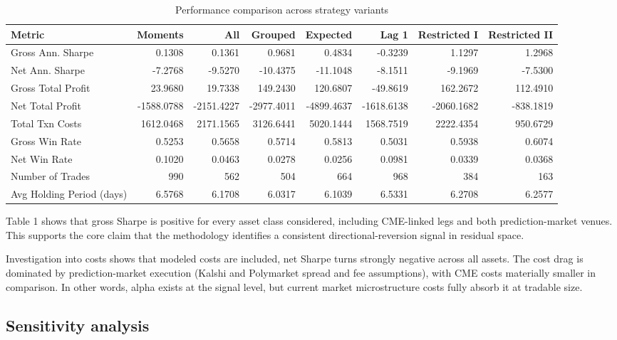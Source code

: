 \begin{table}[h!]
\centering
\begin{tabular}{lrrrrrrr}
\hline
\textbf{Metric} & \textbf{Moments} & \textbf{All} & \textbf{Grouped} & \textbf{Expected}  & \textbf{Lag 1} & \textbf{Restricted I} & \textbf{Restricted II} \\
\hline
Gross Ann. Sharpe & 0.1308 & 0.1361 & 0.9681 & 0.4834 & -0.3239 & 1.1297 & 1.2968 \\
Net Ann. Sharpe & -7.2768 & -9.5270 & -10.4375 & -11.1048 & -8.1511 & -9.1969 & -7.5300 \\
Gross Total Profit & 23.9680 & 19.7338 & 149.2430 & 120.6807 & -49.8619 & 162.2672 & 112.4910 \\
Net Total Profit & -1588.0788 & -2151.4227 & -2977.4011 & -4899.4637 & -1618.6138 & -2060.1682 & -838.1819 \\
Total Txn Costs & 1612.0468 & 2171.1565 & 3126.6441 & 5020.1444 & 1568.7519 & 2222.4354 & 950.6729 \\
Gross Win Rate & 0.5253 & 0.5658 & 0.5714 & 0.5813 & 0.5031 & 0.5938 & 0.6074 \\
Net Win Rate & 0.1020 & 0.0463 & 0.0278 & 0.0256 & 0.0981 & 0.0339 & 0.0368 \\
Number of Trades & 990 & 562 & 504 & 664 & 968 & 384 & 163 \\
Avg Holding Period (days) & 6.5768 & 6.1708 & 6.0317 & 6.1039 & 6.5331 & 6.2708 & 6.2577 \\
\hline
\end{tabular}
\caption{Performance comparison across strategy variants}
\end{table}

Table 1 shows that gross Sharpe is positive for every asset class considered, including CME-linked legs and both prediction-market venues. This supports the core claim that the methodology identifies a consistent directional-reversion signal in residual space. 

Investigation into costs shows that modeled costs are included, net Sharpe turns strongly negative across all assets. The cost drag is dominated by prediction-market execution (Kalshi and Polymarket spread and fee assumptions), with CME costs materially smaller in comparison. In other words, alpha exists at the signal level, but current market microstructure costs fully absorb it at tradable size.

\subsection{Sensitivity analysis}

